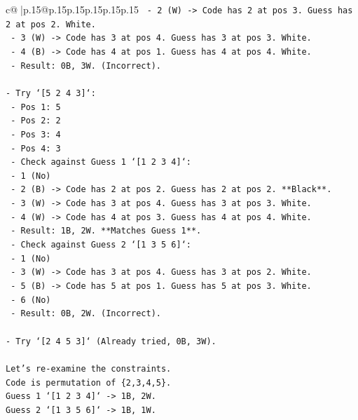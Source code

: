 \documentclass{article}
\begin{document}
{\begin{supertabular}{c@{$\;$}|p{.15\linewidth}@{}p{.15\linewidth}p{.15\linewidth}p{.15\linewidth}p{.15\linewidth}p{.15\linewidth}}
{{{\texttt{        {-}   2 (W) {-}> Code has 2 at pos 3. Guess has 2 at pos 2. White.} \\
\texttt{        {-}   3 (W) {-}> Code has 3 at pos 4. Guess has 3 at pos 3. White.} \\
\texttt{        {-}   4 (B) {-}> Code has 4 at pos 1. Guess has 4 at pos 4. White.} \\
\texttt{        {-}   Result: 0B, 3W. (Incorrect).} \\
\\ 
\texttt{{-}   Try `{[}5 2 4 3{]}`:} \\
\texttt{    {-}   Pos 1: 5} \\
\texttt{    {-}   Pos 2: 2} \\
\texttt{    {-}   Pos 3: 4} \\
\texttt{    {-}   Pos 4: 3} \\
\texttt{    {-}   Check against Guess 1 `{[}1 2 3 4{]}`:} \\
\texttt{        {-}   1 (No)} \\
\texttt{        {-}   2 (B) {-}> Code has 2 at pos 2. Guess has 2 at pos 2. **Black**.} \\
\texttt{        {-}   3 (W) {-}> Code has 3 at pos 4. Guess has 3 at pos 3. White.} \\
\texttt{        {-}   4 (W) {-}> Code has 4 at pos 3. Guess has 4 at pos 4. White.} \\
\texttt{        {-}   Result: 1B, 2W. **Matches Guess 1**.} \\
\texttt{    {-}   Check against Guess 2 `{[}1 3 5 6{]}`:} \\
\texttt{        {-}   1 (No)} \\
\texttt{        {-}   3 (W) {-}> Code has 3 at pos 4. Guess has 3 at pos 2. White.} \\
\texttt{        {-}   5 (B) {-}> Code has 5 at pos 1. Guess has 5 at pos 3. White.} \\
\texttt{        {-}   6 (No)} \\
\texttt{        {-}   Result: 0B, 2W. (Incorrect).} \\
\\ 
\texttt{{-}   Try `{[}2 4 5 3{]}` (Already tried, 0B, 3W).} \\
\\ 
\texttt{Let's re{-}examine the constraints.} \\
\texttt{Code is permutation of \{2,3,4,5\}.} \\
\texttt{Guess 1 `{[}1 2 3 4{]}` {-}> 1B, 2W.} \\
\texttt{Guess 2 `{[}1 3 5 6{]}` {-}> 1B, 1W.} \\
}}}
\end{supertabular}}
\end{document}

